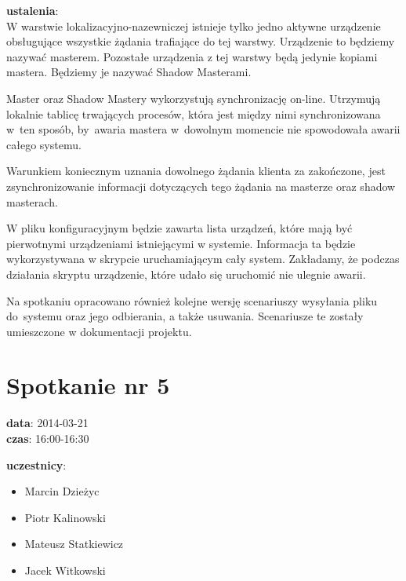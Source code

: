 \vspace{5mm}
\noindent
\textbf{ustalenia}: \\
W warstwie lokalizacyjno-nazewniczej istnieje tylko jedno aktywne urządzenie
obsługujące wszystkie żądania trafiające do tej warstwy. Urządzenie to będziemy
nazywać masterem. Pozostałe urządzenia z tej warstwy będą jedynie kopiami
mastera. Będziemy je nazywać Shadow Masterami.

\vspace{5mm}
Master oraz Shadow Mastery wykorzystują synchronizację on-line. Utrzymują
lokalnie tablicę trwających procesów, która jest między nimi synchronizowana
w~ten sposób, by~awaria mastera w~dowolnym momencie nie spowodowała awarii
całego systemu.

\vspace{5mm}
Warunkiem koniecznym uznania dowolnego żądania klienta za zakończone, jest
zsynchronizowanie informacji dotyczących tego żądania na masterze oraz shadow
masterach.

\vspace{5mm}
W pliku konfiguracyjnym będzie zawarta lista urządzeń, które mają być
pierwotnymi urządzeniami istniejącymi w systemie. Informacja ta będzie
wykorzystywana w skrypcie uruchamiającym cały system. Zakładamy, że podczas
działania skryptu urządzenie, które udało się uruchomić nie ulegnie awarii.

\vspace{5mm}
Na spotkaniu opracowano również kolejne wersję scenariuszy wysyłania pliku
do~systemu oraz jego odbierania, a także usuwania. Scenariusze te zostały
umieszczone w dokumentacji projektu.

\section[Spotkanie nr 5][Spotkanie nr 5]{Spotkanie nr 5}

\noindent
\textbf{data}: 2014-03-21 \\
\textbf{czas}: 16:00-16:30

\vspace{5mm}
\noindent
\textbf{uczestnicy}:
\begin{itemize}
	\item Marcin Dzieżyc
	\item Piotr Kalinowski
	\item Mateusz Statkiewicz
	\item Jacek Witkowski
\end{itemize}

